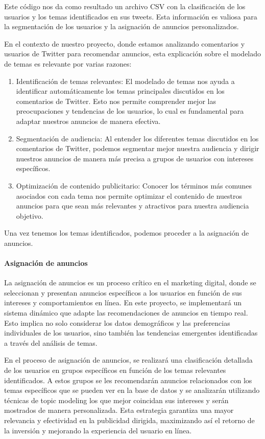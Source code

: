 \documentclass[
  letterpaper,
  DIV=11,
  numbers=noendperiod]{scrartcl}
\let\oldparagraph\paragraph
\renewcommand{\paragraph}[1]{\oldparagraph{#1}\mbox{}}
\begin{document}
Este código nos da como resultado un archivo CSV con la clasificación de
los usuarios y los temas identificados en sus tweets. Esta información
es valiosa para la segmentación de los usuarios y la asignación de
anuncios personalizados.

En el contexto de nuestro proyecto, donde estamos analizando comentarios
y usuarios de Twitter para recomendar anuncios, esta explicación sobre
el modelado de temas es relevante por varias razones:

\begin{enumerate}
\def\labelenumi{\arabic{enumi}.}
\item
  Identificación de temas relevantes: El modelado de temas nos ayuda a
  identificar automáticamente los temas principales discutidos en los
  comentarios de Twitter. Esto nos permite comprender mejor las
  preocupaciones y tendencias de los usuarios, lo cual es fundamental
  para adaptar nuestros anuncios de manera efectiva.
\item
  Segmentación de audiencia: Al entender los diferentes temas discutidos
  en los comentarios de Twitter, podemos segmentar mejor nuestra
  audiencia y dirigir nuestros anuncios de manera más precisa a grupos
  de usuarios con intereses específicos.
\item
  Optimización de contenido publicitario: Conocer los términos más
  comunes asociados con cada tema nos permite optimizar el contenido de
  nuestros anuncios para que sean más relevantes y atractivos para
  nuestra audiencia objetivo.
\end{enumerate}

Una vez tenemos los temas identificados, podemos proceder a la
asignación de anuncios.

\paragraph{Asignación de anuncios}\label{asignaciuxf3n-de-anuncios}

La asignación de anuncios es un proceso crítico en el marketing digital,
donde se seleccionan y presentan anuncios específicos a los usuarios en
función de sus intereses y comportamientos en línea. En este proyecto,
se implementará un sistema dinámico que adapte las recomendaciones de
anuncios en tiempo real. Esto implica no solo considerar los datos
demográficos y las preferencias individuales de los usuarios, sino
también las tendencias emergentes identificadas a través del análisis de
temas.

En el proceso de asignación de anuncios, se realizará una clasificación
detallada de los usuarios en grupos específicos en función de los temas
relevantes identificados. A estos grupos se les recomendarán anuncios
relacionados con los temas específicos que se pueden ver en la base de
datos y se analizarán utilizando técnicas de topic modeling los que
mejor coincidan sus intereses y serán mostrados de manera personalizada.
Esta estrategia garantiza una mayor relevancia y efectividad en la
publicidad dirigida, maximizando así el retorno de la inversión y
mejorando la experiencia del usuario en línea.
\end{document}
